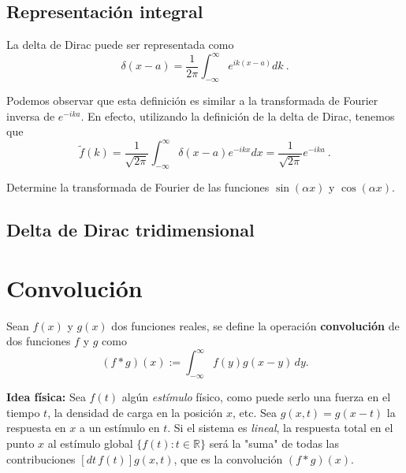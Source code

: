 \subsection{Representación integral}

La delta de Dirac puede ser representada como
\begin{equation}
    \delta(x-a) = \frac{1}{2\pi} \int_{-\infty}^{\infty} e^{ik(x-a)} dk \ .
\end{equation}

Podemos observar que esta definición es similar a la transformada de Fourier inversa de $e^{-ika}$. En efecto, utilizando la definición de la delta de Dirac, tenemos que
\begin{equation}
    \tilde{f}(k) = \frac{1}{\sqrt{2\pi}} \int_{-\infty}^\infty \delta(x-a) e^{-ikx} dx = \frac{1}{\sqrt{2\pi}} e^{-ika} \ .
\end{equation}

\begin{ejemplo}
    Determine la transformada de Fourier de las funciones $\sin(\alpha x)$ y $\cos(\alpha x)$.
\end{ejemplo}

\subsection{Delta de Dirac tridimensional}


\section{Convolución}

\begin{defi}
Sean $f(x)$ y $g(x)$ dos funciones reales, se define la operación \textbf{convolución} de dos funciones $f$ y $g$ como 
\begin{equation}
 (f*g)(x) := \int_{-\infty}^{\infty} f(y) g(x-y) \,dy.   \label{Convolucion}
\end{equation}

\end{defi}

\textbf{Idea física:} Sea $f(t)$ algún \emph{estímulo} físico, como puede serlo una fuerza en el tiempo $t$, la densidad de carga en la posición $x$, etc. Sea $g(x,t) = g(x-t)$ la respuesta en $x$ a un estímulo en $t$. Si el sistema es \textit{lineal}, la respuesta total en el punto $x$ al estímulo global $\{f(t) : t \in \mathbb{R}\}$ será la "suma" de todas las contribuciones $[dt\, f(t)] g(x,t)$, que es la convolución $(f*g)(x)$. 

